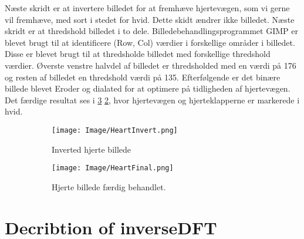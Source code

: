 \documentclass{article}
\begin{document}
Næste skridt er at invertere billedet for at fremhæve hjertevægen, som vi gerne vil fremhæve, med sort i stedet for hvid. Dette skidt ændrer ikke billedet. \newline 
Næste skridt er at thredshold billedet i to dele. Billedebehandlingsprogrammet GIMP er blevet brugt til at identificere (Row, Col) værdier i forskellige områder i billedet. Disse er blevet brugt til at thredsholde billedet med forskellige thredshold værdier. Øverste venstre halvdel af billedet er thredsholded med en værdi på 176 og resten af billedet en thredshold værdi på 135. Efterfølgende er det binære billede blevet Eroder og dialated for at optimere på tidligheden af hjertevægen.\newline 
Det færdige resultat ses i \ref{fig:image5} \ref{fig:f10}, hvor hjertevægen og hjerteklapperne er markerede i hvid. 

\begin{figure}[H] 
     \begin{subfigure}[b]{0.49\textwidth} 
        \texttt{[image: Image/HeartInvert.png]} 
        \caption{Inverted hjerte billede} 
        \label{fig:f9} 
    \end{subfigure} 
     \begin{subfigure}[b]{0.49\textwidth}    
        \texttt{[image: Image/HeartFinal.png]} 
        \caption{Hjerte billede færdig behandlet.} 
        \label{fig:f10} 
    \end{subfigure} 
        \caption{} 
    \label{fig:image5} 
\end{figure} 

  
\newpage 
\section{Decribtion of inverseDFT} 
\end{document}
